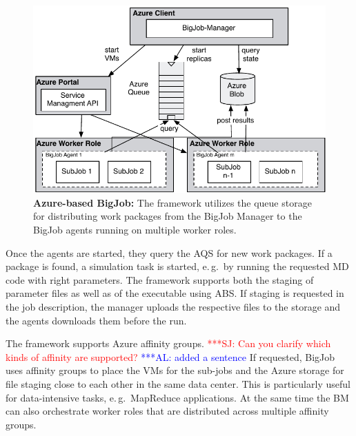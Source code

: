 \documentclass[conference,final]{IEEEtran}
\newcommand{\up}{\vspace*{-1em}}
\newcommand{\alnote}[1]{ {\textcolor{blue} { ***AL: #1 }}}
\newcommand{\jhanote}[1]{ {\textcolor{red} { ***SJ: #1 }}}
\newcommand{\alnote}[1]{}
\newcommand{\jhanote}[1]{}
\begin{document}


\begin{figure}
    \centering
    \includegraphics[width=.4\textwidth]{figures/bigjob_azure}
    \caption{\textbf{Azure-based BigJob:} The framework
      utilizes the queue storage for distributing work
      packages from the BigJob Manager to the
      BigJob agents running on multiple worker roles.}
    \label{fig:figures_bigjob_azure}
    \up\up
\end{figure}

Once the agents are started, they query the AQS for new work packages.
If a package is found, a simulation task is started, e.\,g.\ by
running the requested MD code with right parameters. The framework
supports both the staging of parameter files as well as of the
executable using ABS. If staging is requested in the job description, 
the manager uploads the respective files
to the storage and the agents downloads them before the run.

The framework supports Azure affinity groups.
\jhanote{Can you clarify which kinds of affinity are supported?} 
\alnote{added a sentence}
If requested,
BigJob uses affinity groups to place the VMs for the sub-jobs and the Azure 
storage for file staging close to each other in the same data center. 
This is particularly useful for
data-intensive tasks, e.\,g.\ MapReduce applications. At the same time
the BM can also orchestrate worker roles that are distributed across
multiple affinity groups.


\end{document}
